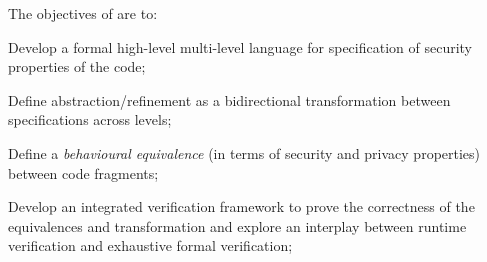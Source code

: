 \addtocounter{wpno}{1}
\begin{Workpackage}{\thewpno}
\WPTitle{\wpname{\thewpno}}


\begin{WPObjectives}
The objectives of \theWP{} are to:
\begin{compactitem}
\item Develop a formal high-level multi-level language for specification of security properties of the code; 

\item Define abstraction/refinement as a bidirectional transformation between specifications across levels;


\item Define a \emph{behavioural equivalence} (in terms of security and privacy properties) between code fragments;


\item Develop an integrated verification framework to prove the correctness of the equivalences and transformation and 
explore an interplay between runtime verification and exhaustive formal verification;


\end{compactitem}
\end{WPObjectives}
\end{Workpackage}
